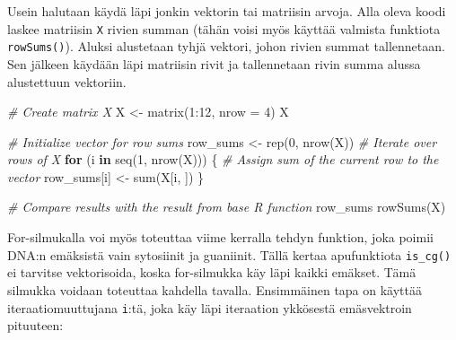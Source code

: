 \documentclass[
]{book}
\newenvironment{Shaded}{\begin{snugshade}}{\end{snugshade}}
\newcommand{\AttributeTok}[1]{\textcolor[rgb]{0.77,0.63,0.00}{#1}}
\newcommand{\CommentTok}[1]{\textcolor[rgb]{0.56,0.35,0.01}{\textit{#1}}}
\newcommand{\ControlFlowTok}[1]{\textcolor[rgb]{0.13,0.29,0.53}{\textbf{#1}}}
\newcommand{\DecValTok}[1]{\textcolor[rgb]{0.00,0.00,0.81}{#1}}
\newcommand{\FunctionTok}[1]{\textcolor[rgb]{0.00,0.00,0.00}{#1}}
\newcommand{\NormalTok}[1]{#1}
\newcommand{\OtherTok}[1]{\textcolor[rgb]{0.56,0.35,0.01}{#1}}
\newcommand{\SpecialCharTok}[1]{\textcolor[rgb]{0.00,0.00,0.00}{#1}}
\begin{document}
Usein halutaan käydä läpi jonkin vektorin tai matriisin arvoja. Alla oleva koodi laskee matriisin \texttt{X} rivien summan (tähän voisi myös käyttää valmista funktiota \texttt{rowSums()}). Aluksi alustetaan tyhjä vektori, johon rivien summat tallennetaan. Sen jälkeen käydään läpi matriisin rivit ja tallennetaan rivin summa alussa alustettuun vektoriin.

\begin{Shaded}
\begin{Highlighting}[]
\CommentTok{\# Create matrix X}
\NormalTok{X }\OtherTok{\textless{}{-}} \FunctionTok{matrix}\NormalTok{(}\DecValTok{1}\SpecialCharTok{:}\DecValTok{12}\NormalTok{, }\AttributeTok{nrow =} \DecValTok{4}\NormalTok{)}
\NormalTok{X}

\CommentTok{\# Initialize vector for row sums}
\NormalTok{row\_sums }\OtherTok{\textless{}{-}} \FunctionTok{rep}\NormalTok{(}\DecValTok{0}\NormalTok{, }\FunctionTok{nrow}\NormalTok{(X))}
\CommentTok{\# Iterate over rows of X}
\ControlFlowTok{for}\NormalTok{ (i }\ControlFlowTok{in} \FunctionTok{seq}\NormalTok{(}\DecValTok{1}\NormalTok{, }\FunctionTok{nrow}\NormalTok{(X))) \{}
  \CommentTok{\# Assign sum of the current row to the vector}
\NormalTok{  row\_sums[i] }\OtherTok{\textless{}{-}} \FunctionTok{sum}\NormalTok{(X[i, ])}
\NormalTok{\}}

\CommentTok{\# Compare results with the result from base R function}
\NormalTok{row\_sums}
\FunctionTok{rowSums}\NormalTok{(X)}
\end{Highlighting}
\end{Shaded}

For-silmukalla voi myös toteuttaa viime kerralla tehdyn funktion, joka poimii DNA:n emäksistä vain sytosiinit ja guaniinit. Tällä kertaa apufunktiota \texttt{is\_cg()} ei tarvitse vektorisoida, koska for-silmukka käy läpi kaikki emäkset. Tämä silmukka voidaan toteuttaa kahdella tavalla. Ensimmäinen tapa on käyttää iteraatiomuuttujana \texttt{i}:tä, joka käy läpi iteraation ykkösestä emäsvektroin pituuteen:
\end{document}
